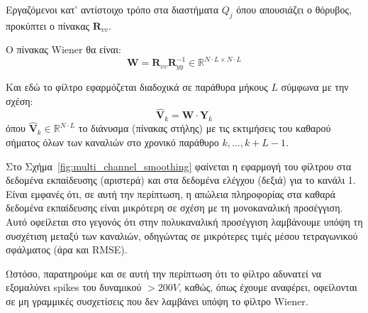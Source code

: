 \documentclass[12pt]{article} %
\begin{document}
Εργαζόμενοι κατ' αντίστοιχο τρόπο στα διαστήματα $Q_j$ όπου απουσιάζει ο θόρυβος, προκύπτει ο πίνακας 
$\mathbf{R}_{vv}$.

Ο πίνακας Wiener θα είναι:
\[
\mathbf{W} = \mathbf{R}_{vv}\mathbf{R}_{yy}^{-1} \in \mathbb{R}^{N \cdot L \times N \cdot L}
\]

Και εδώ το φίλτρο εφαρμόζεται διαδοχικά σε παράθυρα μήκους $L$ σύμφωνα με την σχέση:
\[
\hat{\mathbf{V}}_k = \mathbf{W} \cdot \mathbf{Y}_k
\] 
όπου $\hat{\mathbf{V}}_k \in \mathbb{R}^{N \cdot L}$ το διάνυσμα (πίνακας στήλης) με τις εκτιμήσεις του καθαρού 
σήματος όλων των καναλιών στο χρονικό παράθυρο $k,...,k+L-1$.

Στο Σχήμα~\ref{fig:multi_channel_smoothing} φαίνεται η εφαρμογή του φίλτρου στα δεδομένα εκπαίδευσης 
(αριστερά) και στα δεδομένα ελέγχου (δεξιά) για το κανάλι 1. Είναι εμφανές ότι, σε αυτή την περίπτωση, 
η απώλεια πληροφορίας στα καθαρά δεδομένα εκπαίδευσης είναι μικρότερη σε σχέση με τη μονοκαναλική προσέγγιση.  
Αυτό οφείλεται στο γεγονός ότι στην πολυκαναλική προσέγγιση λαμβάνουμε υπόψη τη συσχέτιση μεταξύ των καναλιών,  
οδηγώντας σε μικρότερες τιμές μέσου τετραγωνικού σφάλματος (άρα και RMSE).

Ωστόσο, παρατηρούμε και σε αυτή την περίπτωση ότι το φίλτρο αδυνατεί να εξομαλύνει 
spikes του δυναμικού $ > 200 V$, καθώς, όπως έχουμε αναφέρει,
οφείλονται σε μη γραμμικές συσχετίσεις που δεν λαμβάνει υπόψη το φίλτρο 
Wiener.
\end{document}
